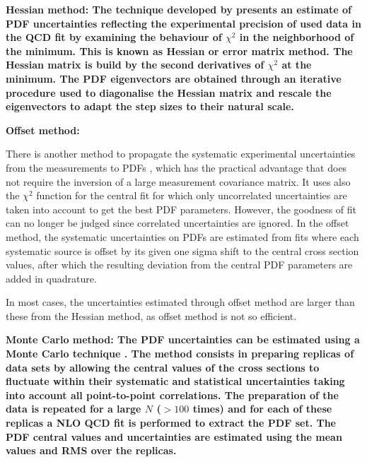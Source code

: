 \begin{description}
\item \bf{Hessian method:} \rm
The technique developed by \cite{Pumplin:2001ct} presents an estimate of PDF uncertainties reflecting the experimental precision of used data in the QCD fit by examining the behaviour of $\chi^2$ in the neighborhood of the minimum. This is known as Hessian or error matrix method. The Hessian matrix is build by the second derivatives of $\chi^2$ at the minimum. The PDF eigenvectors are obtained through an iterative procedure used to diagonalise the Hessian matrix and rescale the eigenvectors to adapt the step sizes to their natural scale.

\item \bf{Offset  method:} \rm

There is another method to propagate the systematic experimental uncertainties from the measurements to PDFs \cite{Botje:2001fx}, which has the practical advantage that does not require the inversion of a large measurement covariance matrix.
%
It uses also the $\chi^2$ function for the central fit for which only
uncorrelated uncertainties are taken into account to get the best PDF parameters.
%
However, the goodness of fit can no longer be judged since correlated uncertainties are ignored. 
%
In the offset method, the systematic uncertainties on PDFs are estimated from fits where each systematic source is offset by its given one sigma shift to the central cross section values, after which the 
resulting deviation from the central PDF parameters are added in quadrature. 

In most cases, the uncertainties estimated through offset method are larger than these from the Hessian method, as offset method is not so efficient.

\item \bf{Monte Carlo method:} \rm
The PDF uncertainties can be estimated using a Monte Carlo technique \cite{Giele:1998gw, mcmethod2}.
The method consists in preparing replicas of data sets by allowing the central values of the cross sections to 
fluctuate within their systematic and statistical uncertainties taking into account all point-to-point correlations.
The preparation of the data is repeated for a large $N$ ($>100$ times) and for each of these replicas a NLO QCD fit is performed to 
extract the PDF set. The PDF central values and uncertainties are estimated using the mean values and RMS 
over the replicas. 
\end{description}


